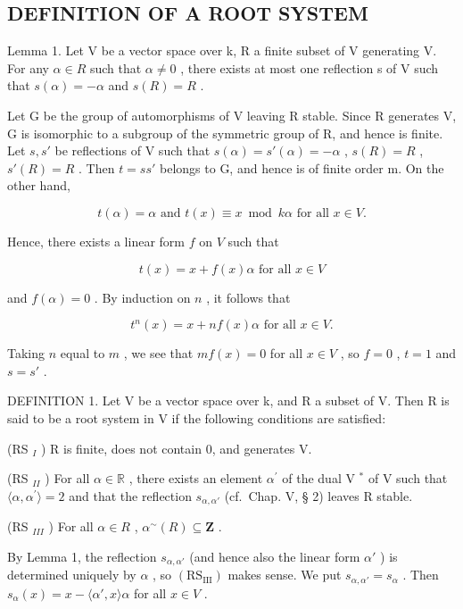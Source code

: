 \subsection{DEFINITION OF A ROOT SYSTEM}

Lemma 1. Let V be a vector space over k, R a finite subset of V generating V. For any \(\alpha \in R\) such that \(\alpha \neq 0\) , there exists at most one reflection s of V such that \(s(\alpha) = -\alpha\) and \(s(R) = R\) .

Let G be the group of automorphisms of V leaving R stable. Since R generates V, G is isomorphic to a subgroup of the symmetric group of R, and hence is finite. Let \(s, s'\) be reflections of V such that \(s(\alpha) = s'(\alpha) = -\alpha\) , \(s(R) = R\) , \(s'(R) = R\) . Then \(t = ss'\) belongs to G, and hence is of finite order m. On the other hand,

\[
t (\alpha) = \alpha \text { and } t (x) \equiv x \bmod k \alpha \text { for   all } x \in V.
\]

Hence, there exists a linear form \(f\) on \(V\) such that

\[
t (x) = x + f (x) \alpha \text {   for   all   } x \in V
\]

and \(f(\alpha) = 0\) . By induction on \(n\) , it follows that

\[
t ^ {n} (x) = x + n f (x) \alpha \text {   for   all   } x \in V.
\]

Taking \(n\) equal to \(m\) , we see that \(mf(x) = 0\) for all \(x \in V\) , so \(f = 0\) , \(t = 1\) and \(s = s'\) .

DEFINITION 1. Let V be a vector space over k, and R a subset of V. Then R is said to be a root system in V if the following conditions are satisfied:

(RS \(_{I}\) ) R is finite, does not contain 0, and generates V.

(RS \(_{II}\) ) For all \(\alpha \in \mathbb{R}\) , there exists an element \(\alpha^{\prime}\) of the dual V \(^{*}\) of V such that \(\langle \alpha, \alpha^{\prime} \rangle = 2\) and that the reflection \(s_{\alpha, \alpha'}\) (cf.~Chap. V, § 2) leaves R stable.

(RS \(_{III}\) ) For all \(\alpha \in R\) , \(\alpha^{\sim}(R) \subseteq \mathbf{Z}\) .

By Lemma 1, the reflection \(s_{\alpha, \alpha'}\) (and hence also the linear form \(\alpha'\) ) is determined uniquely by \(\alpha\) , so \((\mathrm{RS}_{\mathrm{III}})\) makes sense. We put \(s_{\alpha, \alpha'} = s_{\alpha}\) . Then \(s_{\alpha}(x) = x - \langle \alpha', x \rangle \alpha\) for all \(x \in V\) .

